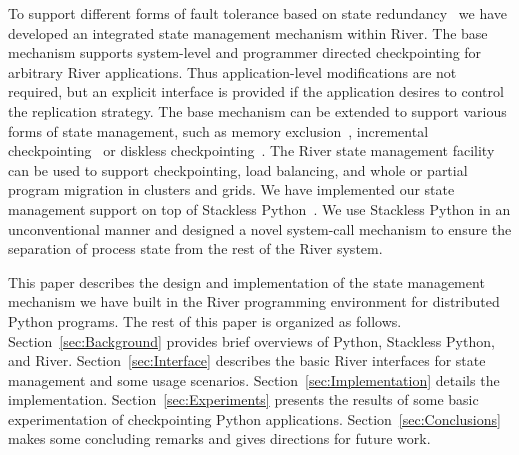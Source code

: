 To support different forms of fault tolerance based on state
redundancy~\cite{Gartner:1999:FT} we have developed an integrated state
management mechanism within River. The base mechanism supports
system-level and programmer directed checkpointing for arbitrary River
applications. Thus application-level modifications are not required, but
an explicit interface is provided if the application desires to control
the replication strategy. The base mechanism can be extended to support
various forms of state management, such as memory
exclusion~\cite{Plank:1999:CheckpointExclusion}, incremental
checkpointing~\cite{Plank:1995:Libckpt} or diskless
checkpointing~\cite{Plank:1998:CheckpointDiskless,Chen:2005:CheckpointCoding}.
The River state management facility can be used to support
checkpointing, load balancing, and whole or partial program migration in
clusters and grids. We have implemented our state management support on
top of Stackless
Python~\cite{Tismer:2000:StacklessPython,Stackless:2007}. We use
Stackless Python in an unconventional manner and designed a novel
system-call mechanism to ensure the separation of process state from the
rest of the River system.



This paper describes the design and implementation of the state management mechanism we have built in the River programming environment for distributed Python programs.
The rest of this paper is organized as follows.
Section~\ref{sec:Background} provides brief overviews of Python, Stackless Python, and River. 
Section~\ref{sec:Interface} describes the basic River interfaces for state management and some usage scenarios.
Section~\ref{sec:Implementation} details the implementation.
Section~\ref{sec:Experiments} presents the results of some basic experimentation of checkpointing Python applications.
Section~\ref{sec:Conclusions} makes some concluding remarks and gives
directions for future work.
